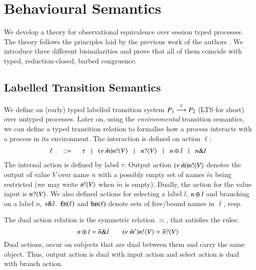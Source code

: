 \section{Behavioural Semantics}
\label{sec:beh_sem}
\label{sec:behavioural}

\noi We develop a theory for observational equivalence over
session typed \HOp processes.
The theory follows the principles laid by the previous
work of the authors \cite{KYHH2015,KY2015,dkphdthesis}.
We introduce three different bisimilarities and prove
that
all of them coincide with typed, reduction-closed,
barbed congruence. 

\subsection{Labelled Transition Semantics}
\label{subsec:lts}

We define an (early) typed labelled transition system
$P_1 \stackrel{\ell}{\longrightarrow} P_2$ (LTS for short) over
untyped processes.
Later on, using the \emph{environmental} transition semantics, 
we can define a typed transition relation to formalise 
how a process interacts with a process in its environment.
The interaction
is defined on action $\ell$:
%
\[
	\begin{array}{rcl}
		\ell	& \;\;::=\;\;  & \tau 
		\;\;\;|\;\;\; (\nu\ \tilde{m}) n ! \langle V \rangle 
		\;\;\;|\;\;\;n ? \langle V \rangle 
		\;\;\;|\;\;\; n \oplus l 
		\;\;\;|\;\;\; n \& l 
	\end{array}
\]
%
\noi The internal action is defined by label $\tau$.
Output action $(\nu\ \tilde{m}) n ! \langle V \rangle$ denotes the output of value
$V$ over name $n$ with a possibly empty set of names $\tilde{m}$
being restricted (we may write $n ! \langle V \rangle$  when $\tilde{m}$ is empty).
Dually, the action for the value input is $n ? \langle V \rangle$.
We also defined actions for selecting a label
$l$, $n \oplus l$ and branching on a label
$n$, $s \& l$.
$\mathtt{fn}(\ell)$ and $\mathtt{bn}(\ell)$ denote 
sets of free/bound names in $\ell$, resp.

The dual action relation is the symmetric relation $\asymp$, that satisfies the rules:
%
\[
	n \oplus l \asymp \overline{n} \& l
	\qquad
	(\nu\ \tilde{m}') n ! \langle V \rangle \asymp \overline{n} ? \langle V \rangle
\]
%
Dual actions, occur on subjects that are dual between
them and carry the same object. Thus,
output action is dual with input action and 
select action is dual with branch action.



